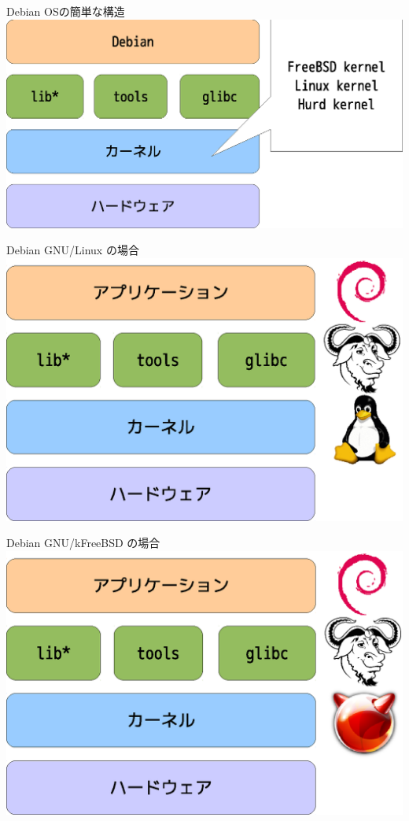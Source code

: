 \begin{frame}{Debian OSの簡単な構造}
\includegraphics[width=1.0\hsize]{image201006/os-block01-3.eps}
\end{frame}


\begin{frame}{Debian GNU/Linux の場合}
\includegraphics[width=0.8\hsize]{image201006/os-block02.eps}
\end{frame}

\begin{frame}{Debian GNU/kFreeBSD の場合}
\includegraphics[width=0.8\hsize]{image201006/os-block03.eps}
\end{frame}

